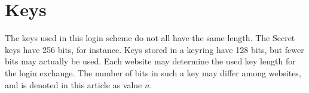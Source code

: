 %
%
%
\section{Keys}
The keys used in this login scheme do not all have the same length.
The Secret keys have 256 bits, for instance.
Keys stored in a keyring have 128 bits,
but fewer bits may actually be used.
Each website may determine the used key length for the login exchange.
The number of bits in such a key may differ among websites,
and is denoted in this article as value $n$.

